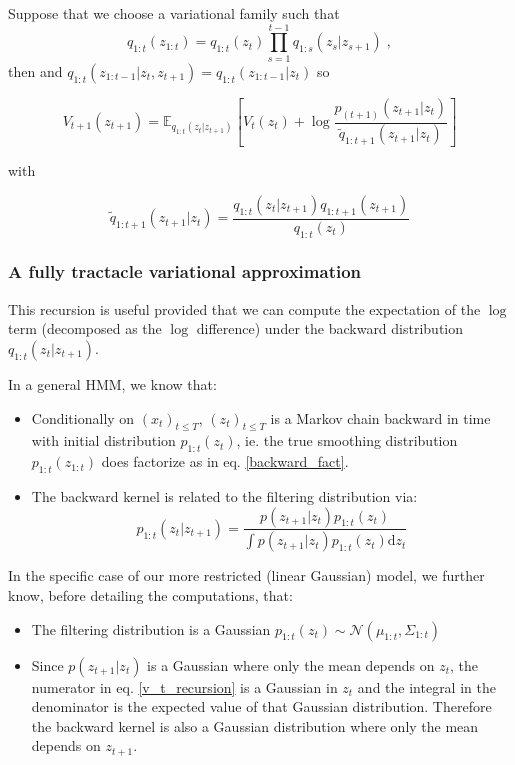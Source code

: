 \documentclass{article}
\newcommand{\1}{\mathbbm{1}}
\newcommand{\rmd}{\ensuremath{\mathrm{d}}}
\newcommand{\eqsp}{\;}
\newcommand{\expect}[2]{\mathbb{E}_{#1}\left[#2\right]}
\newcommand{\gaussian}[2]{\mathcal{N}\left( #1, #2 \right)}
\newcommand{\vbackward}[1]{q_{1:#1}(z_{#1}|z_{#1 + 1})}
\newcommand{\vfilt}[1]{q_{1:#1}(z_{#1})}
\begin{document}
Suppose that we choose a variational family such that 
\begin{equation}\label{backward_fact}
    q_{1:t}(z_{1:t}) = \vfilt{t}\prod_{s=1}^{t-1} q_{1:s}(z_s|z_{s+1})\eqsp,
\end{equation}
then and $q_{1:t}(z_{1:t-1}|z_t, z_{t+1}) = q_{1:t}(z_{1:t-1}|z_t)$ so

\begin{equation}\label{v_t_recursion}
    V_{t+1}(z_{t+1}) = \expect{\vbackward{t}}{V_t(z_t) + \log\frac{p_{(t+1)}(z_{t+1}|z_t)}{\tilde{q}_{1:t+1}(z_{t+1}|z_t)}}
\end{equation}

with 

\begin{equation}
    \tilde{q}_{1:t+1}(z_{t+1}|z_t) = \frac{\vbackward{t}\vfilt{t+1}}{\vfilt{t}}
\end{equation}

\subsubsection*{A fully tractacle variational approximation}
This recursion is useful provided that we can compute the expectation of the $\log$ term (decomposed as the $\log$ difference) under the backward distribution $\vbackward{t}$. 

In a general HMM, we know that:

\begin{itemize}
    \item Conditionally on $(x_t)_{t \leq T}$, $(z_t)_{t \leq T}$ is a Markov chain backward in time with initial distribution $p_{1:t}(z_t)$, ie. the true smoothing distribution $p_{1:t}(z_{1:t})$ does factorize as in eq. \ref{backward_fact}.
    \item The backward kernel is related to the filtering distribution via: $$p_{1:t}(z_t|z_{t+1}) = \frac{p(z_{t+1}|z_t)p_{1:t}(z_t)}{\int p(z_{t+1}|z_t)p_{1:t}(z_t)\rmd z_t}$$
\end{itemize} 

In the specific case of our more restricted (linear Gaussian) model, we further know, before detailing the computations, that:

\begin{itemize}
    \item The filtering distribution is a Gaussian $p_{1:t}(z_t) \sim \gaussian{\mu_{1:t}}{\Sigma_{1:t}}$
    \item Since $p(z_{t+1}|z_t)$ is a Gaussian where only the mean depends on $z_t$, the numerator in eq. \ref{v_t_recursion} is a Gaussian in $z_t$ and the integral in the denominator is the expected value of that Gaussian distribution. Therefore the backward kernel is also a Gaussian distribution where only the mean depends on $z_{t+1}$. 
\end{itemize} 
\end{document}
